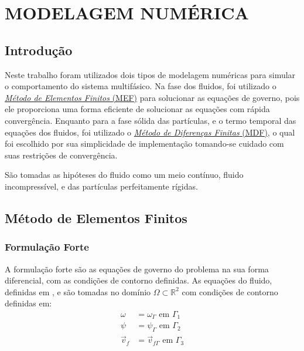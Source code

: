 \chapter{\textbf{MODELAGEM NUMÉRICA}}
\label{sec_modelagem}

\section{\textbf{Introdução}}
Neste trabalho foram utilizados dois tipos de modelagem numéricas para simular o comportamento do sistema multifásico.
Na fase dos fluidos, foi utilizado o \hyperref[mef]{\textit{Método de Elementos Finitos} (MEF)} para solucionar as equações de governo, pois ele proporciona uma forma eficiente de solucionar as equações com rápida convergência.
Enquanto para a fase sólida das partículas, e o termo temporal das equações dos fluidos, foi utilizado o \hyperref[mdf]{\textit{Método de Diferenças Finitas} (MDF)}, o qual foi escolhido por sua simplicidade de implementação tomando-se cuidado com suas restrições de convergência.

São tomadas as hipóteses do fluido como um meio contínuo, fluido incompressível, e das partículas perfeitamente rígidas.
\section{\textbf{Método de Elementos Finitos}}
\label{mef}
\subsection{\textbf{Formulação Forte}}
\label{form_forte}
A formulação forte são as equações de governo do problema na sua forma diferencial, com as condições de contorno definidas.
As equações do fluido, definidas em ,  e  são tomadas no domínio $\Omega \subset \mathbb{R}^2$ com condições de contorno definidas em:
\begin{align}
    \omega &= \omega_{\Gamma} \text{ em } \Gamma_1 \\
    \psi &= \psi_{\Gamma} \text{ em } \Gamma_2 \\
    \vec{v}_f &= \vec{v}_{f\Gamma} \text{ em } \Gamma_3 
\end{align}

